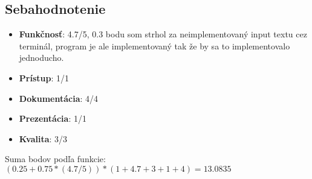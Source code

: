 \documentclass[a4paper, 11pt]{article}
\begin{document}
        \subsection{Sebahodnotenie}
            \begin{itemize}
                \item \textbf{Funkčnosť}: 4.7/5, 0.3 bodu som strhol za neimplementovaný input textu cez terminál, program je ale implementovaný tak že by sa to implementovalo jednoducho.
                \item \textbf{Prístup}: 1/1
                \item \textbf{Dokumentácia}: 4/4
                \item \textbf{Prezentácia}: 1/1
                \item \textbf{Kvalita}: 3/3
            \end{itemize}
        
            Suma bodov podľa funkcie: $(0.25 + 0.75 * (4.7 / 5)) * (1 + 4.7 + 3 + 1 + 4) = 13.0835$
        

    \newpage
    
	
\end{document}
